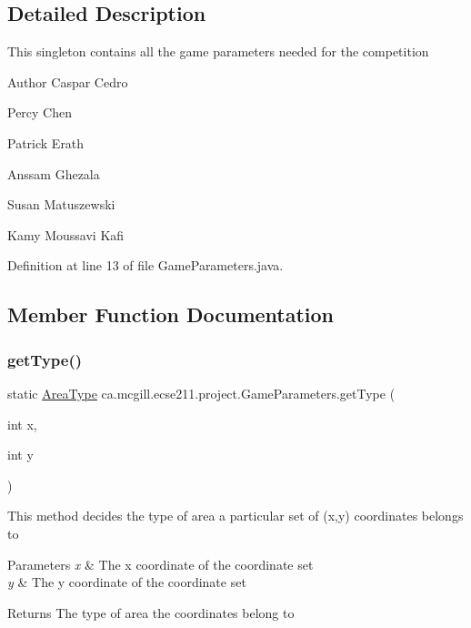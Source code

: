 \subsection{Detailed Description}
This singleton contains all the game parameters needed for the competition

\begin{DoxyAuthor}{Author}
Caspar Cedro 

Percy Chen 

Patrick Erath 

Anssam Ghezala 

Susan Matuszewski 

Kamy Moussavi Kafi 
\end{DoxyAuthor}


Definition at line 13 of file Game\+Parameters.\+java.



\subsection{Member Function Documentation}
\mbox{\label{enumca_1_1mcgill_1_1ecse211_1_1project_1_1_game_parameters_a4e7713b30588fc0b2af065db0b198b2c}} 
\subsubsection{\texorpdfstring{get\+Type()}{getType()}}
{\footnotesize\ttfamily static \hyperlink{enumca_1_1mcgill_1_1ecse211_1_1project_1_1_game_parameters_1_1_area_type}{Area\+Type} ca.\+mcgill.\+ecse211.\+project.\+Game\+Parameters.\+get\+Type (\begin{DoxyParamCaption}\item[{int}]{x,  }\item[{int}]{y }\end{DoxyParamCaption})\hspace{0.3cm}{\ttfamily [static]}}

This method decides the type of area a particular set of (x,y) coordinates belongs to


\begin{DoxyParams}{Parameters}
{\em x} & The x coordinate of the coordinate set \\
\hline
{\em y} & The y coordinate of the coordinate set \\
\hline
\end{DoxyParams}
\begin{DoxyReturn}{Returns}
The type of area the coordinates belong to 
\end{DoxyReturn}

